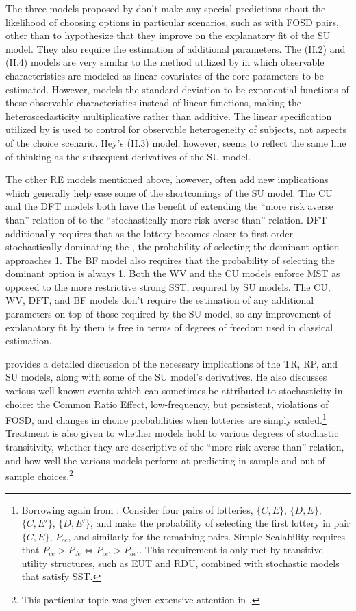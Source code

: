 \documentclass[../main.tex]{subfiles}
\begin{document}
The three models proposed by \textcite{Hey1995} don't make any special predictions about the likelihood of choosing options in particular scenarios, such as with FOSD pairs, other than to hypothesize that they improve on the explanatory fit of the SU model.
They also require the estimation of additional parameters.
The (H.2) and (H.4) models are very similar to the method utilized by \textcite[142]{Harrison2009} in which observable characteristics are modeled as linear covariates of the core parameters to be estimated.
However, \textcite{Hey1995} models the standard deviation to be exponential functions of these observable characteristics instead of linear functions, making the heteroscedasticity multiplicative rather than additive.
The linear specification utilized by \textcite{Harrison2009} is used to control for observable heterogeneity of subjects, not aspects of the choice scenario.
Hey's (H.3) model, however, seems to reflect the same line of thinking as the subsequent derivatives of the SU model.

The other RE models mentioned above, however, often add new implications which generally help ease some of the shortcomings of the SU model.
The CU and the DFT models both have the benefit of extending the \enquote{more risk averse than} relation of \textcite{Pratt1964} to the \enquote{stochastically more risk averse than} relation.
DFT additionally requires that as the lottery becomes closer to first order stochastically dominating the {\CE}, the probability of selecting the dominant option approaches 1.
The BF model also requires that the probability of selecting the dominant option is always 1.
Both the WV and the CU models enforce MST as opposed to the more restrictive strong SST,  required by SU models.
The CU, WV, DFT, and BF models don't require the estimation of any additional parameters on top of those required by the SU model, so any improvement of explanatory fit by them is free in terms of degrees of freedom used in classical estimation.

\textcite{Wilcox2008} provides a detailed discussion of the necessary implications of the TR, RP,  and SU models, along with some of the SU model's derivatives.
He also discusses various well known events which can sometimes be attributed to stochasticity in choice: the Common Ratio Effect, low-frequency, but persistent, violations of FOSD, and changes in choice probabilities when lotteries are simply scaled.\footnote{ Borrowing again from \textcite[249]{Wilcox2008}: Consider four pairs of lotteries, $\{C,E\}$, $\{D,E\}$,$\{C,E'\}$, $\{D,E'\}$, and make the probability of selecting the first lottery in pair $\{C,E\}$, $P_{\mathit{ce}}$, and similarly for the remaining pairs.
Simple Scalability requires that $P_{\mathit{ce}} > P_{\mathit{de}} \iff P_{\mathit{ce}'} > P_{\mathit{de}'}$.
This requirement is only met by transitive utility structures, such as EUT and RDU, combined with stochastic models that satisfy SST.}
Treatment is also given to whether models hold to various degrees of stochastic transitivity, whether they are descriptive of the \enquote{more risk averse than} relation, and how well the various models perform at predicting in-sample and out-of-sample choices.\footnote{ This particular topic was given extensive attention in \textcite{Wilcox2007}.}
\end{document}
